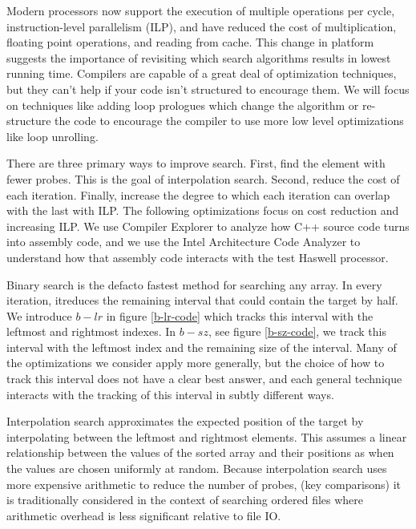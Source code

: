 \documentclass[twocolumn]{article}
\begin{document}
Modern processors now support the execution of multiple operations per cycle, instruction-level parallelism (ILP), and have reduced the cost of multiplication, floating point operations, and reading from cache. This change in platform suggests the importance of revisiting which search algorithms results in lowest running time. Compilers are capable of a great deal of optimization techniques, but they can't help if your code isn't structured to encourage them. We will focus on techniques like adding loop prologues which change the algorithm or re-structure the code to encourage the compiler to use more low level optimizations like loop unrolling.

There are three primary ways to improve search. First, find the element with fewer probes. This is the goal of interpolation search. Second, reduce the cost of each iteration. Finally, increase the degree to which each iteration can overlap with the last with ILP. The following optimizations focus on cost reduction and increasing ILP. We use Compiler Explorer to analyze how C++ source code turns into assembly code, and we use the Intel Architecture Code Analyzer to understand how that assembly code interacts with the test Haswell processor.


Binary search is the defacto fastest method for searching any array. In every iteration, itreduces the remaining interval that could contain the target by half. We introduce $b-lr$ in figure \ref{b-lr-code} which tracks this interval with the leftmost and rightmost indexes. In $b-sz$, see figure \ref{b-sz-code}, we track this interval with the leftmost index and the remaining size of the interval. Many of the optimizations we consider apply more generally, but the choice of how to track this interval does not have a clear best answer, and each general technique interacts with the tracking of this interval in subtly different ways. 

Interpolation search approximates the expected position of the target by interpolating between the leftmost and rightmost elements. This assumes a linear relationship between the values of the sorted array and their positions as when the values are chosen uniformly at random. Because interpolation search uses more expensive arithmetic to reduce the number of probes, (key comparisons) it is traditionally considered in the context of searching ordered files where arithmetic overhead is less significant relative to file IO.
\end{document}
